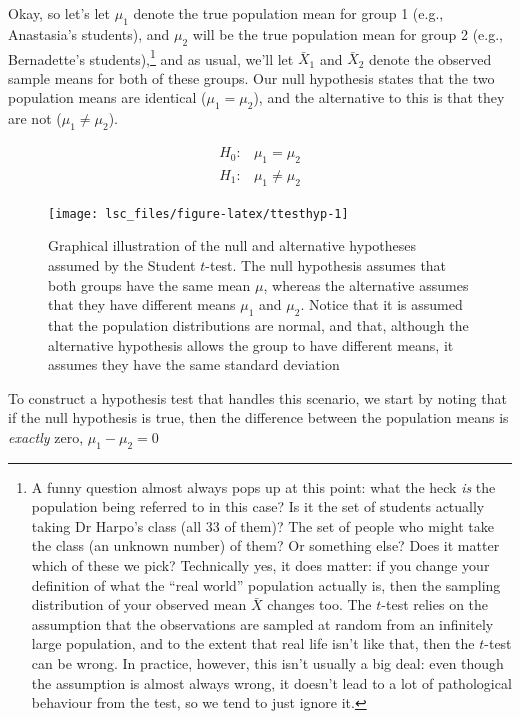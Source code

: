 \documentclass[
  11pt,
  a4paper,
  twoside,symmetric,openright]{book}
\theoremstyle{break}
\theoremstyle{break}
\begin{document}
Okay, so let's let \(\mu_1\) denote the true population mean for group 1 (e.g., Anastasia's students), and \(\mu_2\) will be the true population mean for group 2 (e.g., Bernadette's students),\footnote{A funny question almost always pops up at this point: what the heck \emph{is} the population being referred to in this case? Is it the set of students actually taking Dr Harpo's class (all 33 of them)? The set of people who might take the class (an unknown number) of them? Or something else? Does it matter which of these we pick? Technically yes, it does matter: if you change your definition of what the ``real world'' population actually is, then the sampling distribution of your observed mean \(\bar{X}\) changes too. The \(t\)-test relies on the assumption that the observations are sampled at random from an infinitely large population, and to the extent that real life isn't like that, then the \(t\)-test can be wrong. In practice, however, this isn't usually a big deal: even though the assumption is almost always wrong, it doesn't lead to a lot of pathological behaviour from the test, so we tend to just ignore it.} and as usual, we'll let \(\bar{X}_1\) and \(\bar{X}_2\) denote the observed sample means for both of these groups. Our null hypothesis states that the two population means are identical (\(\mu_1 = \mu_2\)), and the alternative to this is that they are not (\(\mu_1 \neq \mu_2\)).

\[
\begin{array}{ll}
H_0: & \mu_1 = \mu_2  \\
H_1: & \mu_1 \neq \mu_2
\end{array}
\]

\begin{figure}

{\centering \texttt{[image: lsc\_files/figure-latex/ttesthyp-1]} 

}

\caption{Graphical illustration of the null and alternative hypotheses assumed by the Student $t$-test. The null hypothesis assumes that both groups have the same mean $\mu$, whereas the alternative assumes that they have different means $\mu_1$ and $\mu_2$. Notice that it is assumed that the population distributions are normal, and that, although the alternative hypothesis allows the group to have different means, it assumes they have the same standard deviation}\label{fig:ttesthyp}
\end{figure}

To construct a hypothesis test that handles this scenario, we start by noting that if the null hypothesis is true, then the difference between the population means is \emph{exactly} zero,
\(\mu_1 - \mu_2 = 0\)
\end{document}
